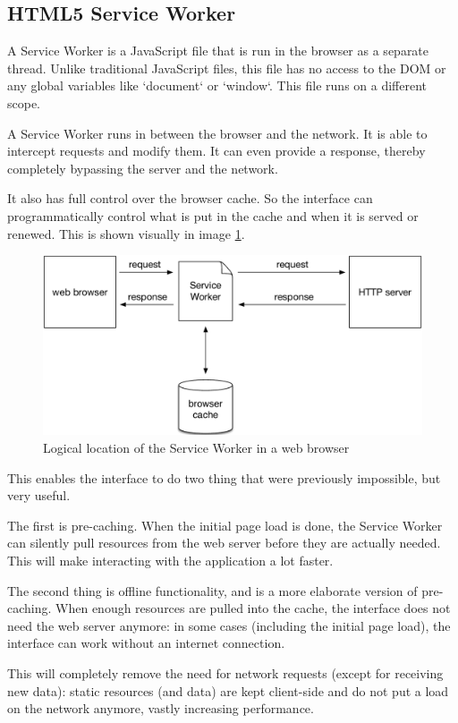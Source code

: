 \subsection{HTML5 Service Worker}
A Service Worker is a JavaScript file that is run in the browser as a separate
thread.
Unlike traditional JavaScript files, this file has no access to the DOM or any
global variables like `document` or `window`. This file runs on a different scope.

A Service Worker runs in between the browser and the network. It is able to
intercept requests and modify them. It can even provide a response, thereby
completely bypassing the server and the network.

It also has full control over the browser cache. So the interface can programmatically
control what is put in the cache and when it is served or renewed.
This is shown visually in image \ref{fig:service_worker}.

\begin{figure}
  \centering
  \includegraphics[width=\textwidth]{images/service_worker}
  \caption{Logical location of the Service Worker in a web browser}
  \label{fig:service_worker}
\end{figure}

This enables the interface to do two thing that were previously impossible, but
very useful.

The first is pre-caching. When the initial page load is done, the Service Worker
can silently pull resources from the web server before they are actually needed.
This will make interacting with the application a lot faster.

The second thing is offline functionality, and is a more elaborate version of
pre-caching.
When enough resources are pulled into the cache, the interface does not need the
web server anymore: in some cases (including the initial page load), the interface can work without an internet connection.

This will completely remove the need for network requests (except for receiving
new data): static resources (and data) are kept client-side and do not put a
load on the network anymore, vastly increasing performance.

